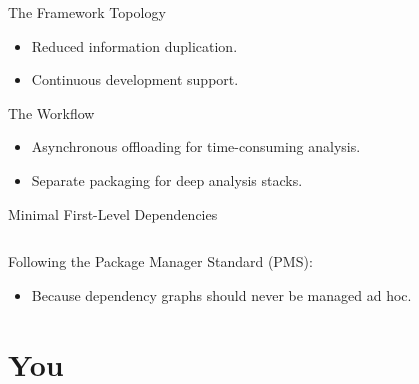 			\begin{frame}{The Framework Topology}
				\begin{minipage}{0.55\textwidth}
					\begin{itemize}
						\item Reduced information duplication.
						\item Continuous development support.
					\end{itemize}
				\end{minipage}
				\begin{minipage}{0.43\textwidth}
					\vspace{-3em}
					\begin{figure}
						\centering
					\end{figure}
				\end{minipage}
			\end{frame}
			\begin{frame}{The Workflow}
				\begin{itemize}
					\item Asynchronous offloading for time-consuming analysis.
					\item Separate packaging for deep analysis stacks.
				\end{itemize}
				\vspace{-2em}
				\begin{figure}
					\centering
				\end{figure}
			\end{frame}
			\begin{frame}{Minimal First-Level Dependencies}
				\inputminted[bgcolor=tlg,firstline=18,lastline=25]{bash}{.gentoo/app-text/repsep/repsep-99999.ebuild}
				Following the Package Manager Standard (PMS):
				\begin{itemize}
					\item Because dependency graphs should never be managed ad hoc.
				\end{itemize}
			\end{frame}
	\section{You}
